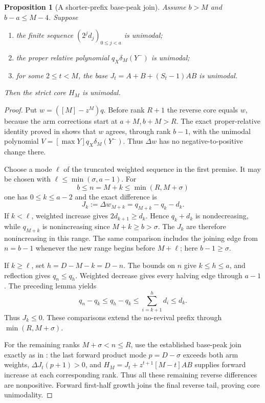 \documentclass[11pt]{article}
\newtheorem{proposition}{Proposition}[section]
\begin{document}
\begin{proposition}[A shorter-prefix base-peak join]
Assume $b>M$ and $b-a\le M-4$. Suppose
\begin{enumerate}
\item the finite sequence $(2^jd_j)_{0\le j<a}$ is unimodal;
\item the proper relative polynomial $q_X\delta_M(Y^-)$ is unimodal;
\item for some $2\le t<M$, the base
$J_t=A+B+(S_t-1)AB$ is unimodal.
\end{enumerate}
Then the strict core $H_M$ is unimodal.
\end{proposition}
\begin{proof}
Put $w=([M]-z^M)q$. Before rank $R+1$ the reverse core
equals $w$, because the arm corrections start at $a+M,b+M>R$.
The exact proper-relative identity proved in
{\normalfont{}} shows that $w$ agrees,
through rank $b-1$, with the unimodal polynomial
$V=[\max Y]q_X\delta_M(Y^-)$.
Thus $\Delta w$ has no negative-to-positive change there.

Choose a mode $\ell$ of the truncated weighted sequence in
the first premise. It may be chosen with
$\ell\le\min(\sigma,a-1)$. For
\[
              b\le n=M+k\le\min(R,M+\sigma)
\]
one has $0\le k\le a-2$ and the exact difference is
\[
                   J_k:=\Delta w_{M+k}=q_{M+k}-q_k-d_k.
\]
If $k<\ell$, weighted increase gives
$2d_{k+1}\ge d_k$. Hence $q_k+d_k$ is nondecreasing,
while $q_{M+k}$ is nonincreasing since $M+k\ge b>\sigma$.
The $J_k$ are therefore nonincreasing in this range. The same
comparison includes the joining edge from $n=b-1$ whenever
the new range begins before $M+\ell$; here $b-1\ge\sigma$.

If $k\ge\ell$, set $h=D-M-k=D-n$. The bounds on $n$
give $k\le h\le a$, and reflection gives $q_n\le q_h$.
Weighted decrease gives every halving edge through $a-1$.
The preceding lemma yields
\[
 q_n-q_k\le q_h-q_k
       \le\sum_{i=k+1}^{h}d_i\le d_k.
\]
Thus $J_k\le0$. These comparisons extend the no-revival
prefix through $\min(R,M+\sigma)$.

For the remaining ranks $M+\sigma<n\le R$, use the established
base-peak join exactly as in {\normalfont{}}:
the last forward product mode $p=D-\sigma$ exceeds both arm weights,
$\Delta J_t(p+1)>0$, and
$H_M=J_t+z^{t+1}[M-t]AB$ supplies forward increase at each
corresponding rank. Thus all these remaining reverse differences
are nonpositive. Forward first-half growth joins the final reverse
tail, proving core unimodality.
\end{proof}
\end{document}
